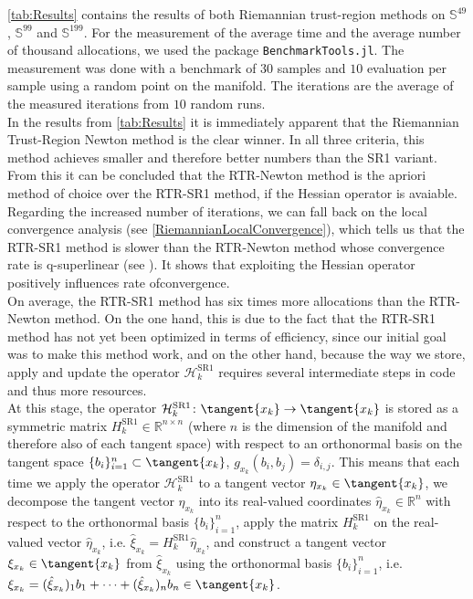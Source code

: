 \cref{tab:Results} contains the results of both Riemannian trust-region methods on $\mathbb{S}^{49}$, $\mathbb{S}^{99}$ and $\mathbb{S}^{199}$. For the measurement of the average time and the average number of thousand allocations, we used the package \lstinline!BenchmarkTools.jl!. The measurement was done with a benchmark of $30$ samples and $10$ evaluation per sample using a random point on the manifold. The iterations are the average of the measured iterations from $10$ random runs. \\
In the results from \cref{tab:Results} it is immediately apparent that the Riemannian Trust-Region Newton method is the clear winner. In all three criteria, this method achieves smaller and therefore better numbers than the SR1 variant. From this it can be concluded that the RTR-Newton method is the apriori method of choice over the RTR-SR1 method, if the Hessian operator is avaiable. \\
Regarding the increased number of iterations, we can fall back on the local convergence analysis (see \cref{RiemannianLocalConvergence}), which tells us that the RTR-SR1 method is slower than the RTR-Newton method whose convergence rate is q-superlinear (see \cite[Theorem~4.13]{AbsilBakerGallivan:2007}). It shows that exploiting the Hessian operator positively influences rate ofconvergence. \\ 
On average, the RTR-SR1 method has six times more allocations than the RTR-Newton method. On the one hand, this is due to the fact that the RTR-SR1 method has not yet been optimized in terms of efficiency, since our initial goal was to make this method work, and on the other hand, because the way we store, apply and update the operator $\mathcal{H}^{\mathrm{SR1}}_k$ requires several intermediate steps in code and thus more resources. \\
At this stage, the operator $\mathcal{H}^{\mathrm{SR1}}_k \colon \tangent{x_k} \to \tangent{x_k}$ is stored as a symmetric matrix $H^{\mathrm{SR1}}_k \in \mathbb{R}^{n \times n}$ (where $n$ is the dimension of the manifold and therefore also of each tangent space) with respect to an orthonormal basis on the tangent space $\{ b_i \}^{n}_{i=1} \subset \tangent{x_k}$, $g_{x_k}(b_i, b_j) = \delta_{i,j}$. This means that each time we apply the operator $\mathcal{H}^{\mathrm{SR1}}_k$ to a tangent vector $\eta_{x_k} \in \tangent{x_k}$, we decompose the tangent vector $\eta_{x_k}$ into its real-valued coordinates $\hat{\eta}_{x_k} \in \mathbb{R}^n$ with respect to the orthonormal basis $\{ b_i \}^{n}_{i=1}$, apply the matrix $H^{\mathrm{SR1}}_k$ on the real-valued vector $\hat{\eta}_{x_k}$, i.e. $\hat{\xi}_{x_k} = H^{\mathrm{SR1}}_k \hat{\eta}_{x_k}$, and construct a tangent vector $\xi_{x_k} \in \tangent{x_k}$ from $\hat{\xi}_{x_k}$ using the orthonormal basis $\{ b_i \}^{n}_{i=1}$, i.e. $\xi_{x_k} = (\hat{\xi}_{x_k})_{1} b_1 + \cdots + (\hat{\xi}_{x_k})_{n} b_n \in \tangent{x_k}$. \\
